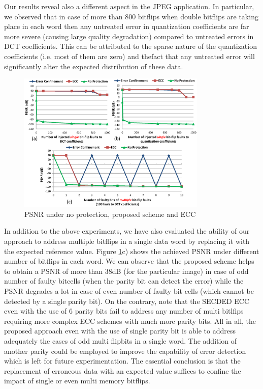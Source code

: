 Our results reveal also a different aspect in the JPEG application. In particular, we observed that in case of more than 800 bitflips when double bitflips are taking place in each word then any untreated error in quantization coefficients are far more severe (causing large quality degradation) compared to untreated errors in DCT coefficients. 
This can be attributed to the sparse nature of the quantization coefficients (i.e. most of them are zero) and thefact that any untreated error will significantly alter the expected distribution of these data. 

\begin{figure}
\centering
\includegraphics[width=90mm]{./eps/qos_snr}
\caption{PSNR under no protection, proposed scheme and ECC}
\vspace{-4mm}
\label{fig:qos_snr}
\end{figure}

In addition to the above experiments, we have also evaluated the ability of our approach to address multiple bitflips in a single data word by replacing it with the expected reference value. Figure \ref{fig:qos_snr}c) shows the achieved PSNR under different number of bitflips in each word. We can observe that the proposed scheme helps to obtain a PSNR of more than 38dB (for the particular image) in case of odd number of faulty bitcells (when the parity bit can detect the error) while the PSNR degrades a lot in case of even number of faulty bit cells (which cannot be detected by a single parity bit). On the contrary, note that the SECDED ECC even with the use of 6 parity bits fail to address any number of multi bitlfips requiring more complex ECC schemes with much more parity bits. All in all, the proposed approach even with the use of single parity bit is able to address adequately the cases of odd multi flipbits in a single word. The addition of another parity could be employed to improve the capability of error detection which is left for future experimentation. The essential conclusion is that the replacement      
of erroneous data with an expected value suffices to confine the impact of single or even multi memory bitflips.  

